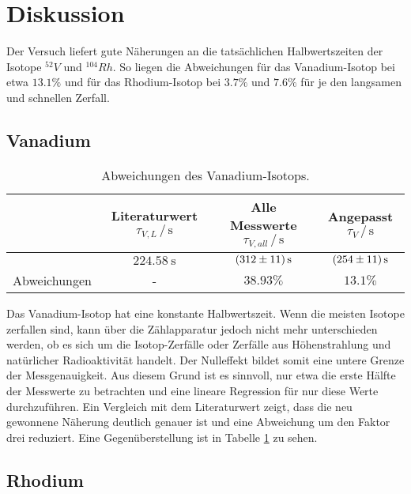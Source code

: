 \section{Diskussion}
\label{sec:Diskussion}

Der Versuch liefert gute Näherungen an die tatsächlichen Halbwertszeiten der Isotope $^{52}V$ und $^{104}Rh$.
So liegen die Abweichungen für das Vanadium-Isotop bei etwa $13.1\%$ und für das Rhodium-Isotop bei $3.7\%$ und $7.6\%$ für je den langsamen und schnellen Zerfall.

\subsection{Vanadium}

\begin{table}
    \centering
    \caption{Abweichungen des Vanadium-Isotops.}
    \label{tab:abwVan}
    \begin{tabular}{c c c c}
        \toprule
         & Literaturwert $\tau_{V,L}\,/\,\si{\second}$\cite{perTable} & Alle Messwerte $\tau_{V,all}\,/\,\si{\second}$ & Angepasst $\tau_{V}\,/\,\si{\second}$ \\
        \midrule
         & $\SI{224.58}{\second}$ & $\SI{312\pm11}{\second}$ & $\SI{254\pm11}{\second}$ \\
        Abweichungen & - & $38.93\%$ & $13.1\%$ \\
        \bottomrule
    \end{tabular}
\end{table}

Das Vanadium-Isotop hat eine konstante Halbwertszeit. Wenn die meisten Isotope zerfallen sind, kann über die Zählapparatur jedoch nicht mehr unterschieden werden,
ob es sich um die Isotop-Zerfälle oder Zerfälle aus Höhenstrahlung und natürlicher Radioaktivität handelt. Der Nulleffekt bildet somit eine untere Grenze der Messgenauigkeit.
Aus diesem Grund ist es sinnvoll, nur etwa die erste Hälfte der Messwerte zu betrachten und eine lineare Regression für nur diese Werte durchzuführen.
Ein Vergleich mit dem Literaturwert zeigt, dass die neu gewonnene Näherung deutlich genauer ist und eine Abweichung um den Faktor drei reduziert.
Eine Gegenüberstellung ist in Tabelle \ref{tab:abwVan} zu sehen.

\subsection{Rhodium}

